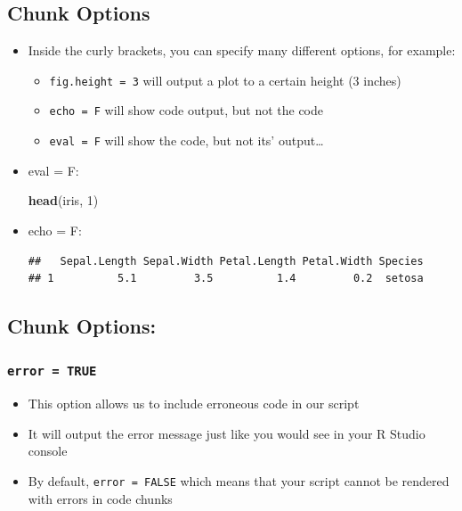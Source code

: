\documentclass[
]{book}
\newenvironment{Shaded}{\begin{snugshade}}{\end{snugshade}}
\newcommand{\DecValTok}[1]{\textcolor[rgb]{0.00,0.00,0.81}{#1}}
\newcommand{\FunctionTok}[1]{\textcolor[rgb]{0.13,0.29,0.53}{\textbf{#1}}}
\newcommand{\NormalTok}[1]{#1}
\providecommand{\tightlist}{%
  \setlength{\itemsep}{0pt}\setlength{\parskip}{0pt}}
\begin{document}
\subsection{Chunk Options}\label{chunk-options}

\begin{itemize}
\item
  Inside the curly brackets, you can specify many different options, for example:

  \begin{itemize}
  \tightlist
  \item
    \texttt{fig.height\ =\ 3} will output a plot to a certain height (3 inches)
  \item
    \texttt{echo\ =\ F} will show code output, but not the code
  \item
    \texttt{eval\ =\ F} will show the code, but not its' output\ldots{}
  \end{itemize}
\item
  eval = F:

\begin{Shaded}
\begin{Highlighting}[]
\FunctionTok{head}\NormalTok{(iris, }\DecValTok{1}\NormalTok{) }
\end{Highlighting}
\end{Shaded}
\item
  echo = F:

\begin{verbatim}
##   Sepal.Length Sepal.Width Petal.Length Petal.Width Species
## 1          5.1         3.5          1.4         0.2  setosa
\end{verbatim}
\end{itemize}

\subsection{Chunk Options:}\label{chunk-options-1}

\subsubsection{\texorpdfstring{\texttt{error\ =\ TRUE}}{error = TRUE}}\label{error-true}

\begin{itemize}
\tightlist
\item
  This option allows us to include erroneous code in our script
\item
  It will output the error message just like you would see in your R Studio console
\item
  By default, \texttt{error\ =\ FALSE} which means that your script cannot be rendered with errors in code chunks
\end{itemize}
\end{document}
